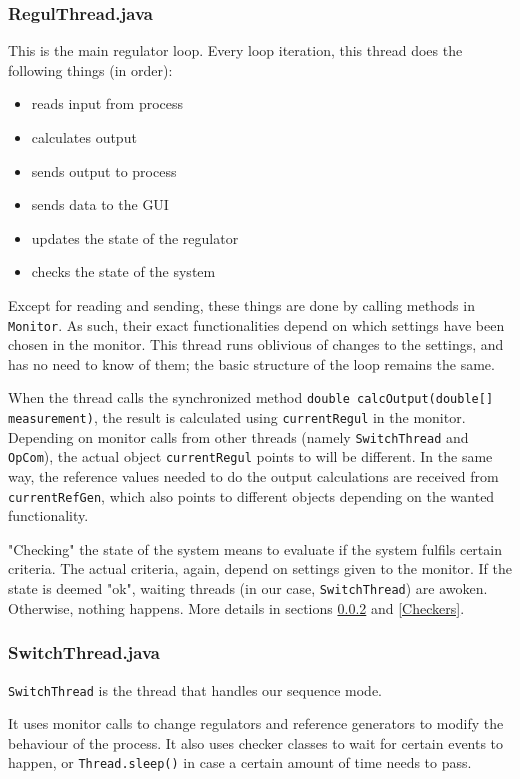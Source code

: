 \subsubsection{RegulThread.java}
This is the main regulator loop. Every loop iteration, this thread does the following things (in order):
\begin{itemize}
\item reads input from process
\item calculates output
\item sends output to process
\item sends data to the GUI
\item updates the state of the regulator
\item checks the state of the system
\end{itemize}

Except for reading and sending, these things are done by calling methods in \texttt{Monitor}. 
As such, their exact functionalities depend on which settings have been chosen in the monitor. 
This thread runs oblivious of changes to the settings, and has no need to know of them; the basic structure of the loop remains the same.

When the thread calls the synchronized method \texttt{double calcOutput(double[] measurement)}, the result is calculated using \texttt{currentRegul} in the monitor. 
Depending on monitor calls from other threads (namely \texttt{SwitchThread} and \texttt{OpCom}), the actual object \texttt{currentRegul} points to will be different. 
In the same way, the reference values needed to do the output calculations are received from \texttt{currentRefGen}, which also points to different objects depending on the wanted functionality.

"Checking" the state of the system means to evaluate if the system fulfils certain criteria. 
The actual criteria, again, depend on settings given to the monitor. 
If the state is deemed "ok", waiting threads (in our case, \texttt{SwitchThread}) are awoken. 
Otherwise, nothing happens. More details in sections \ref{SwitchThread} and \ref{Checkers}.



\subsubsection{SwitchThread.java}\label{SwitchThread}
\texttt{SwitchThread} is the thread that handles our sequence mode.

It uses monitor calls to change regulators and reference generators to modify the behaviour of the process. 
It also uses checker classes to wait for certain events to happen, or \texttt{Thread.sleep()} in case a certain amount of time needs to pass.

